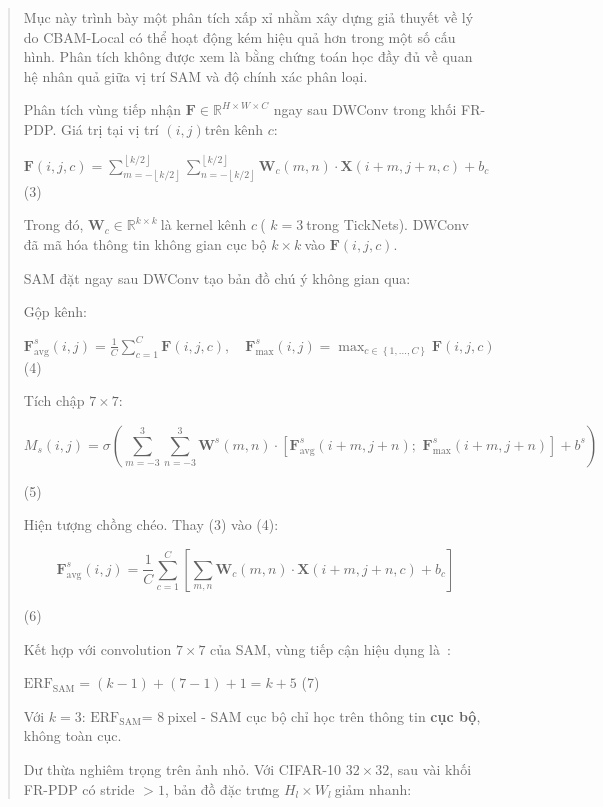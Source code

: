 \documentclass[
  12pt,
  a4paper,
]{report}
\begin{document}
\begin{quote}
Mục này trình bày một phân tích xấp xỉ nhằm xây dựng giả thuyết về lý do
CBAM-Local có thể hoạt động kém hiệu quả hơn trong một số cấu hình. Phân
tích không được xem là bằng chứng toán học đầy đủ về quan hệ nhân quả
giữa vị trí SAM và độ chính xác phân loại.

Phân tích vùng tiếp nhận
\(\mathbf{F} \in \mathbb{R}^{H \times W \times C}\) ngay sau DWConv
trong khối FR-PDP. Giá trị tại vị trí \((i,j)\)trên kênh \(c\):

\(\mathbf{F}(i,j,c) = \sum_{m = - \left\lfloor k/2 \right\rfloor}^{\left\lfloor k/2 \right\rfloor}{\sum_{n = - \left\lfloor k/2 \right\rfloor}^{\left\lfloor k/2 \right\rfloor}\mathbf{W}_{c}}(m,n) \cdot \mathbf{X}(i + m,j + n,c) + b_{c}\)
(3)

Trong đó, \(\mathbf{W}_{c} \in \mathbb{R}^{k \times k}\ \)là kernel kênh
\(c\ \)( \(k = 3\ \)trong TickNets). DWConv đã mã hóa thông tin không
gian cục bộ \(k \times k\ \)vào \(\mathbf{F}(i,j,c)\).

SAM đặt ngay sau DWConv tạo bản đồ chú ý không gian qua:

Gộp kênh:

\(\mathbf{F}_{\text{avg}}^{s}(i,j) = \frac{1}{C}\sum_{c = 1}^{C}\mathbf{F}(i,j,c),\quad\mathbf{F}_{\text{max}}^{s}(i,j) = \max_{c \in \left\{ 1,\ldots,C \right\}}{\mathbf{F}(i,j,c)}\)
(4)

Tích chập \(7 \times 7\):

\[M_{s}(i,j) = \sigma\left( \sum_{m = - 3}^{3}{\sum_{n = - 3}^{3}\mathbf{W}^{s}}(m,n) \cdot \left\lbrack \mathbf{F}_{\text{avg}}^{s}(i + m,j + n);\mspace{6mu}\mathbf{F}_{\text{max}}^{s}(i + m,j + n) \right\rbrack + b^{s} \right)\]

(5)

Hiện tượng chồng chéo. Thay (3) vào (4):

\[\mathbf{F}_{\text{avg}}^{s}(i,j) = \frac{1}{C}\sum_{c = 1}^{C}\left\lbrack \sum_{m,n}^{}\mathbf{W}_{c}(m,n) \cdot \mathbf{X}(i + m,j + n,c) + b_{c} \right\rbrack\]

(6)

Kết hợp với convolution \(7 \times 7\) của SAM, vùng tiếp cận hiệu dụng
là~:

\(\text{ERF}_{\text{SAM}} = (k - 1) + (7 - 1) + 1 = k + 5\) (7)

Với \(k = 3\): \(\text{ERF}_{\text{SAM}}\)= 8\(\ \)pixel - SAM cục bộ
chỉ học trên thông tin \textbf{cục bộ}, không toàn cục.

Dư thừa nghiêm trọng trên ảnh nhỏ. Với CIFAR-10 \(32 \times 32\), sau
vài khối FR-PDP có stride \(> 1\), bản đồ đặc trưng
\(H_{l} \times W_{l}\ \)giảm nhanh:


\end{quote}
\end{document}
